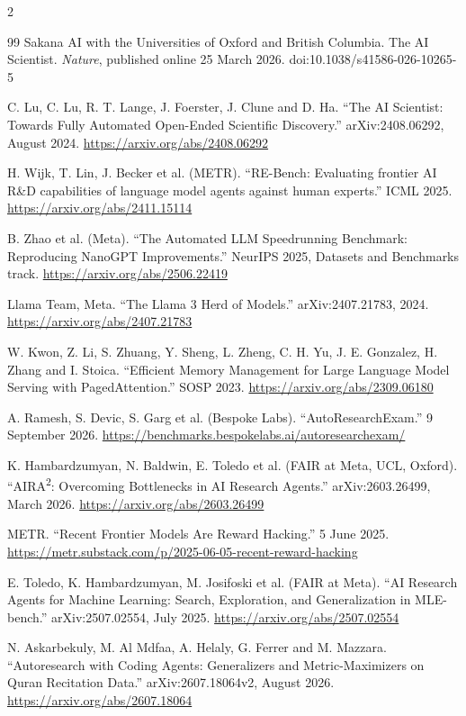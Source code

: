 \documentclass[11pt,letterpaper]{article}
\begin{document}
\begin{multicols}{2}
{\begin{thebibliography}{99}
 Sakana AI with the Universities of Oxford and British Columbia. The AI
Scientist. \emph{Nature}, published online 25 March 2026. doi:10.1038/s41586-026-10265-5

 C. Lu, C. Lu, R. T. Lange, J. Foerster, J. Clune and D. Ha. ``The AI
Scientist: Towards Fully Automated Open-Ended Scientific Discovery.'' arXiv:2408.06292,
August 2024. \url{https://arxiv.org/abs/2408.06292}

 H. Wijk, T. Lin, J. Becker et al. (METR). ``RE-Bench: Evaluating frontier AI
R\&D capabilities of language model agents against human experts.'' ICML 2025.
\url{https://arxiv.org/abs/2411.15114}

 B. Zhao et al. (Meta). ``The Automated LLM Speedrunning Benchmark:
Reproducing NanoGPT Improvements.'' NeurIPS 2025, Datasets and Benchmarks track.
\url{https://arxiv.org/abs/2506.22419}

 Llama Team, Meta. ``The Llama 3 Herd of Models.'' arXiv:2407.21783, 2024.
\url{https://arxiv.org/abs/2407.21783}

 W. Kwon, Z. Li, S. Zhuang, Y. Sheng, L. Zheng, C. H. Yu, J. E. Gonzalez,
H. Zhang and I. Stoica. ``Efficient Memory Management for Large Language Model Serving with
PagedAttention.'' SOSP 2023. \url{https://arxiv.org/abs/2309.06180}

 A. Ramesh, S. Devic, S. Garg et al. (Bespoke Labs). ``AutoResearchExam.''
9 September 2026. \url{https://benchmarks.bespokelabs.ai/autoresearchexam/}

 K. Hambardzumyan, N. Baldwin, E. Toledo et al. (FAIR at Meta, UCL, Oxford).
``AIRA\textsuperscript{2}: Overcoming Bottlenecks in AI Research Agents.'' arXiv:2603.26499,
March 2026. \url{https://arxiv.org/abs/2603.26499}

 METR. ``Recent Frontier Models Are Reward Hacking.'' 5 June 2025.
\url{https://metr.substack.com/p/2025-06-05-recent-reward-hacking}

 E. Toledo, K. Hambardzumyan, M. Josifoski et al. (FAIR at Meta). ``AI
Research Agents for Machine Learning: Search, Exploration, and Generalization in MLE-bench.''
arXiv:2507.02554, July 2025. \url{https://arxiv.org/abs/2507.02554}

 N. Askarbekuly, M. Al Mdfaa, A. Helaly, G. Ferrer and M. Mazzara.
``Autoresearch with Coding Agents: Generalizers and Metric-Maximizers on Quran Recitation
Data.'' arXiv:2607.18064v2, August 2026. \url{https://arxiv.org/abs/2607.18064}


\end{thebibliography}}
\end{multicols}
\end{document}
